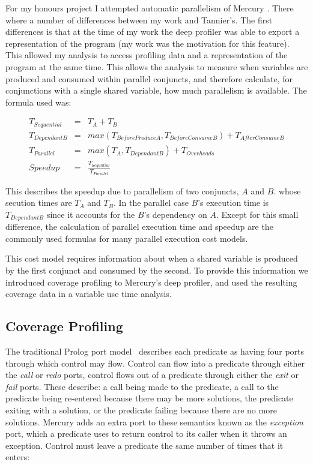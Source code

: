 For my honours project I attempted automatic parallelism of Mercury
\citep{paul_hons}.
There where a number of differences between my work and Tannier's.
The first differences is that at the time of my work the deep profiler
was able to export a representation of the program
(my work was the motivation for this feature).
This allowed my analysis to access profiling data and a representation
of the program at the same time.
This allows the analysis to measure when variables are produced and
consumed within parallel conjuncts,
and therefore calculate,
for conjunctions with a single shared variable,
how much parallelism is available.
The formula used was:

\begin{eqnarray*}
T_{Sequential} & = & T_A + T_B \\
T_{DependantB} & = & max(T_{BeforeProduceA}, T_{BeforeConsumeB}) +
T_{AfterConsumeB} \\
T_{Parallel} & = & max(T_A, T_{DependantB}) + T_{Overheads} \\
Speedup & = & \frac{T_{Sequntial}}{T_{Parallel}}
\end{eqnarray*}

This describes the speedup due to parallelism of two conjuncts, $A$ and $B$.
whose secution times are $T_A$ and $T_B$.
In the parallel case $B$'s execution time is $T_{DependantB}$ since it
accounts for the $B$'s dependency on $A$.
Except for this small difference,
the calculation of parallel execution time and speedup are the commonly
used formulas for many parallel execution cost models.

This cost model requires information about when a shared variable is
produced by the first conjunct and consumed by the second.
To provide this information we introduced coverage profiling to
Mercury's deep profiler,
and used the resulting coverage data in a variable use time analysis.

\subsection{Coverage Profiling}
\label{sec:coverage}

The traditional Prolog port model~\cite{port_model} describes each predicate as
having four ports through which control may flow.
Control can flow into a predicate through either the \emph{call} or
\emph{redo} ports,
control flows out of a predicate through either the \emph{exit} or
\emph{fail} ports.
These describe:
    a call being made to the predicate,
    a call to the predicate being re-entered because there may be more
    solutions,
    the predicate exiting with a solution,
    or the predicate failing because there are no more solutions.
Mercury adds an extra port to these semantics known as the
\emph{exception} port,
which a predicate uses to return control to its caller when it throws an
exception.
Control must leave a predicate the same number of times that it enters:


